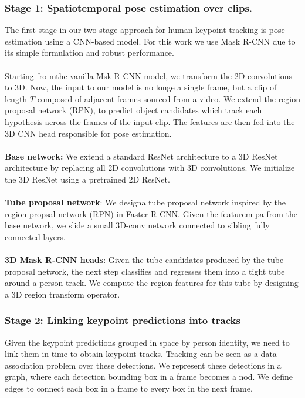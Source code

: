 \documentclass[a4paper]{report}
\begin{document}
\subsubsection*{Stage 1: Spatiotemporal pose estimation over clips.}
The first stage in our two-stage approach for human keypoint tracking is pose estimation using a CNN-based model. For this work we use Mask R-CNN due to its simple formulation and robust performance. 
\\
\\
Starting fro mthe vanilla Msk R-CNN model, we transform the 2D convolutions to 3D. Now, the input to our model is no longe a single frame, but a clip of length $T$ composed of adjacent frames sourced from a video. We extend the region proposal network (RPN), to predict object candidates which track each hypothesis across the frames of the input clip. The features are then fed into the 3D CNN head responsible for pose estimation. 
\\
\\
\textbf{Base network:} We extend a standard ResNet architecture to a 3D ResNet architecture by replacing all 2D convolutions with 3D convolutions. We initialize the 3D ResNet using a pretrained 2D ResNet.
\\
\\
\textbf{Tube proposal network}: We designa  tube proposal network inspired by the region propsal network (RPN) in Faster R-CNN. Given the featurem pa from the base network, we slide a small 3D-conv network connected to sibling fully connected layers.
\\
\\
\textbf{3D Mask R-CNN heads}: Given the tube candidates produced by the tube proposal network, the next step classifies and regresses them into a tight tube around a person track. We compute the region features for this tube by designing a 3D region transform operator.

\subsubsection*{Stage 2: Linking keypoint predictions into tracks}
Given the keypoint predictions grouped in space by person identity, we need to link them in time to obtain keypoint tracks. Tracking can be seen as a data association problem over these detections. We represent these detections in a graph, where each detection bounding box in a frame becomes a nod. We define edges to connect each box in a frame to every box in the next frame.
\end{document}
